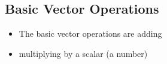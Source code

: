 \begin{slide}
\section[-2]{Basic Vector Operations}

\pb
\begin{itemize}
\item The basic vector operations are adding\pauseh{}
  \begin{center}
    \pause
  \end{center}
\item multiplying by a scalar (a number)\pauseh{}
  \begin{center}
    \pause
  \end{center}
\end{itemize}

\end{slide}



